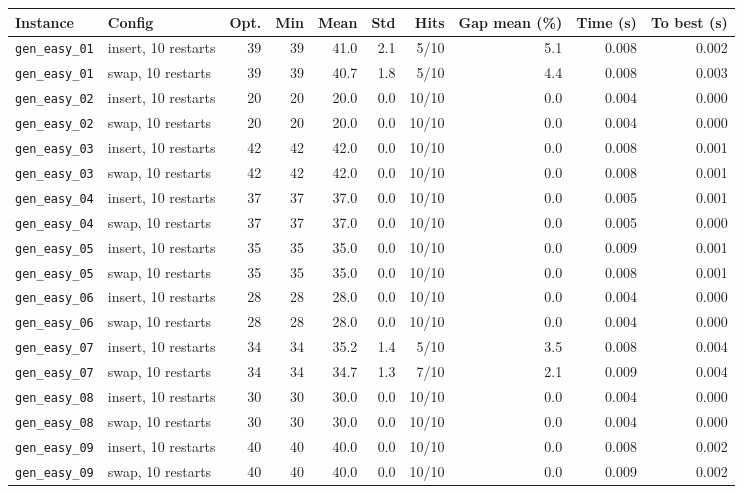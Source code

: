 \begin{tabular}{llrrrrrrrr}
\toprule
Instance & Config & Opt. & Min & Mean & Std & Hits & Gap mean (\%) & Time (s) & To best (s) \\
\midrule
\texttt{gen\_easy\_01} & insert, 10 restarts & 39 & 39 & 41.0 & 2.1 & 5/10 & 5.1 & 0.008 & 0.002 \\
\texttt{gen\_easy\_01} & swap, 10 restarts & 39 & 39 & 40.7 & 1.8 & 5/10 & 4.4 & 0.008 & 0.003 \\
\texttt{gen\_easy\_02} & insert, 10 restarts & 20 & 20 & 20.0 & 0.0 & 10/10 & 0.0 & 0.004 & 0.000 \\
\texttt{gen\_easy\_02} & swap, 10 restarts & 20 & 20 & 20.0 & 0.0 & 10/10 & 0.0 & 0.004 & 0.000 \\
\texttt{gen\_easy\_03} & insert, 10 restarts & 42 & 42 & 42.0 & 0.0 & 10/10 & 0.0 & 0.008 & 0.001 \\
\texttt{gen\_easy\_03} & swap, 10 restarts & 42 & 42 & 42.0 & 0.0 & 10/10 & 0.0 & 0.008 & 0.001 \\
\texttt{gen\_easy\_04} & insert, 10 restarts & 37 & 37 & 37.0 & 0.0 & 10/10 & 0.0 & 0.005 & 0.001 \\
\texttt{gen\_easy\_04} & swap, 10 restarts & 37 & 37 & 37.0 & 0.0 & 10/10 & 0.0 & 0.005 & 0.000 \\
\texttt{gen\_easy\_05} & insert, 10 restarts & 35 & 35 & 35.0 & 0.0 & 10/10 & 0.0 & 0.009 & 0.001 \\
\texttt{gen\_easy\_05} & swap, 10 restarts & 35 & 35 & 35.0 & 0.0 & 10/10 & 0.0 & 0.008 & 0.001 \\
\texttt{gen\_easy\_06} & insert, 10 restarts & 28 & 28 & 28.0 & 0.0 & 10/10 & 0.0 & 0.004 & 0.000 \\
\texttt{gen\_easy\_06} & swap, 10 restarts & 28 & 28 & 28.0 & 0.0 & 10/10 & 0.0 & 0.004 & 0.000 \\
\texttt{gen\_easy\_07} & insert, 10 restarts & 34 & 34 & 35.2 & 1.4 & 5/10 & 3.5 & 0.008 & 0.004 \\
\texttt{gen\_easy\_07} & swap, 10 restarts & 34 & 34 & 34.7 & 1.3 & 7/10 & 2.1 & 0.009 & 0.004 \\
\texttt{gen\_easy\_08} & insert, 10 restarts & 30 & 30 & 30.0 & 0.0 & 10/10 & 0.0 & 0.004 & 0.000 \\
\texttt{gen\_easy\_08} & swap, 10 restarts & 30 & 30 & 30.0 & 0.0 & 10/10 & 0.0 & 0.004 & 0.000 \\
\texttt{gen\_easy\_09} & insert, 10 restarts & 40 & 40 & 40.0 & 0.0 & 10/10 & 0.0 & 0.008 & 0.002 \\
\texttt{gen\_easy\_09} & swap, 10 restarts & 40 & 40 & 40.0 & 0.0 & 10/10 & 0.0 & 0.009 & 0.002 \\

\end{tabular}
